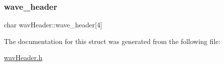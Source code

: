\mbox{\label{structwavHeader_ae9a0bfdec6e8b7ba48dd27d7ac587f62}} 
\subsubsection{\texorpdfstring{wave\+\_\+header}{wave\_header}}
{\footnotesize\ttfamily char wav\+Header\+::wave\+\_\+header\mbox{[}4\mbox{]}}



The documentation for this struct was generated from the following file\+:\begin{DoxyCompactItemize}
\item 
\hyperlink{wavHeader_8h}{wav\+Header.\+h}\end{DoxyCompactItemize}
